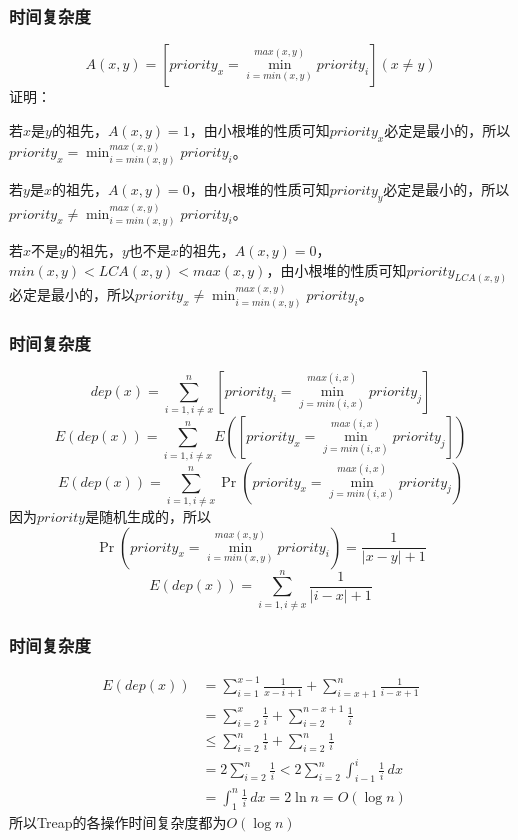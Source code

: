 \documentclass[utf8]{ctexbeamer}
\begin{document}
    \begin{frame}
        \frametitle{时间复杂度}
        \begin{tcolorbox}[colframe=blue,title=引理]
            \[A(x,y)=[priority_x=\min_{i=min(x,y)}^{max(x,y)}priority_i](x\neq y)\]
            证明：

            若$x$是$y$的祖先，$A(x,y)=1$，由小根堆的性质可知$priority_x$必定是最小的，所以$priority_x=\min_{i=min(x,y)}^{max(x,y)}priority_i$。

            若$y$是$x$的祖先，$A(x,y)=0$，由小根堆的性质可知$priority_y$必定是最小的，所以$priority_x\neq\min_{i=min(x,y)}^{max(x,y)}priority_i$。

            若$x$不是$y$的祖先，$y$也不是$x$的祖先，$A(x,y)=0$，$min(x,y)<LCA(x,y)<max(x,y)$，由小根堆的性质可知$priority_{LCA(x,y)}$必定是最小的，所以$priority_x\neq\min_{i=min(x,y)}^{max(x,y)}priority_i$。
        \end{tcolorbox}
    \end{frame}

    \begin{frame}
        \frametitle{时间复杂度}
        \[dep(x)=\sum_{i=1,i\neq x}^{n}[priority_i=\min_{j=min(i,x)}^{max(i,x)}priority_j]\]
        \[E(dep(x))=\sum_{i=1,i\neq x}^{n}E([priority_x=\min_{j=min(i,x)}^{max(i,x)}priority_j])\]
        \[E(dep(x))=\sum_{i=1,i\neq x}^{n}\Pr(priority_x=\min_{j=min(i,x)}^{max(i,x)}priority_j)\]
        因为$priority$是随机生成的，所以
        \[\Pr(priority_x=\min_{i=min(x,y)}^{max(x,y)}priority_i)=\frac{1}{\left\lvert x-y\right\rvert+1}\]    
        \[E(dep(x))=\sum_{i=1,i\neq x}^{n}\frac{1}{\left\lvert i-x\right\rvert+1}\]
    \end{frame}

    \begin{frame}
        \frametitle{时间复杂度}
        \begin{align}
            E(dep(x))&=\sum_{i=1}^{x-1}\frac{1}{x-i+1}+\sum_{i=x+1}^{n}\frac{1}{i-x+1}\nonumber\\
                     &=\sum_{i=2}^{x}\frac{1}{i}+\sum_{i=2}^{n-x+1}\frac{1}{i}\nonumber\\
                     &\le\sum_{i=2}^{n}\frac{1}{i}+\sum_{i=2}^{n}\frac{1}{i}\nonumber\\
                     &=2\sum_{i=2}^{n}\frac{1}{i}<2\sum_{i=2}^{n}\int_{i-1}^{i}\frac{1}{i}\,dx\nonumber\\
                     &=\int_{1}^{n}\frac{1}{i}\,dx=2\ln n=O(\log n)\nonumber
        \end{align}
        所以Treap的各操作时间复杂度都为$O(\log n)$
    \end{frame}
\end{document}
